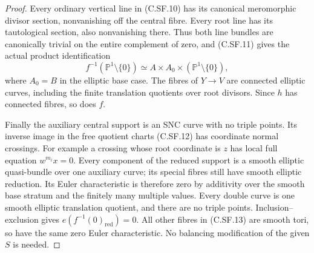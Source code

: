 \begin{proof}
Every ordinary vertical line
in (C.SF.10) has its canonical
meromorphic divisor section,
nonvanishing off the central
fibre. Every root line has
its tautological section,
also nonvanishing there.
Thus both line bundles are
canonically trivial on the
entire complement of zero,
and (C.SF.11) gives the
actual product identification
\[
 f^{-1}(\mathbb P^1\setminus\{0\})
   \simeq A\times A_0\times
                         (\mathbb P^1\setminus\{0\}),
                                                               \tag{C.SF.13}
\]
where $A_0=B$ in the elliptic
base case. The fibres of
$Y\to V$ are connected
elliptic curves, including
the finite translation
quotients over root divisors.
Since $h$ has connected
fibres, so does $f$.

Finally the auxiliary central
support is an SNC curve
with no triple points.
Its inverse image in the
free quotient charts
(C.SF.12) has coordinate
normal crossings. For
example a crossing whose
root coordinate is $z$
has local full equation
$w^{m_i}x=0$. Every
component of the reduced
support is a smooth
elliptic quasi-bundle over
one auxiliary curve; its
special fibres still have
smooth elliptic reduction.
Its Euler characteristic
is therefore zero by
additivity over the smooth
base stratum and the
finitely many multiple
values. Every double
curve is one smooth
elliptic translation
quotient, and there are
no triple points.
Inclusion--exclusion gives
$e(f^{-1}(0)_{\mathrm{red}})=0$.
All other fibres in
(C.SF.13) are smooth tori,
so have the same zero
Euler characteristic.
No balancing modification
of the given $S$ is needed.
\end{proof}
